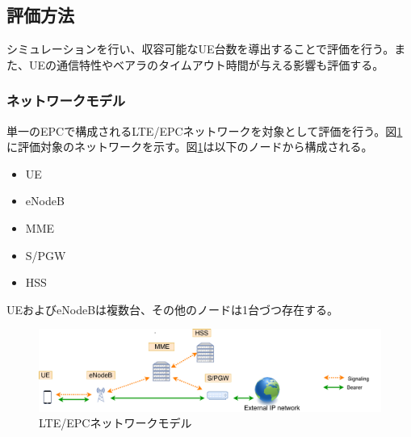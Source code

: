 \documentclass[a4j]{ujarticle}
\begin{document}
%
%
%
%
%
%


\subsection{評価方法}
\label{sec:method}
シミュレーションを行い、収容可能なUE台数を導出することで評価を行う。また、UEの通信特性やベアラのタイムアウト時間が与える影響も評価する。
\subsubsection{ネットワークモデル}
単一のEPCで構成されるLTE/EPCネットワークを対象として評価を行う。図\ref{networkmodel}に評価対象のネットワークを示す。図\ref{networkmodel}は以下のノードから構成される。
\begin{itemize}
  \item UE
  \item eNodeB
  \item MME
  \item S/PGW
	\item HSS
\end{itemize}
UEおよびeNodeBは複数台、その他のノードは1台づつ存在する。
\begin{figure}[htbp]
	\centering
	\includegraphics[width=0.7\hsize]{networkmodel.pdf}
  \caption{LTE/EPCネットワークモデル}
	\label{networkmodel}
\end{figure}
\end{document}
